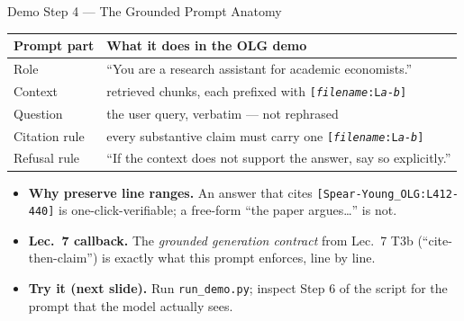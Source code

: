 \begin{frame}{Demo Step 4 --- The Grounded Prompt Anatomy}
\small
\begin{tabular}{p{2.6cm}p{8.9cm}}
\toprule
\textbf{Prompt part} & \textbf{What it does in the OLG demo} \\
\midrule
Role & ``You are a research assistant for academic economists.'' \\
Context & retrieved chunks, each prefixed with \texttt{[\textit{filename}:L\textit{a}-\textit{b}]} \\
Question & the user query, verbatim --- not rephrased \\
Citation rule & every substantive claim must carry one \texttt{[\textit{filename}:L\textit{a}-\textit{b}]} \\
Refusal rule & ``If the context does not support the answer, say so explicitly.'' \\
\bottomrule
\end{tabular}

\vspace{0.3cm}
\begin{itemize}\small
\item \textbf{Why preserve line ranges.} An answer that cites \texttt{[Spear-Young\_OLG:L412-440]} is one-click-verifiable; a free-form ``the paper argues\dots'' is not.

\item \textbf{Lec.\ 7 callback.} The \emph{grounded generation contract} from Lec.\ 7 T3b (``cite-then-claim'') is exactly what this prompt enforces, line by line.

\item \textbf{Try it (next slide).} Run \texttt{run\_demo.py}; inspect Step 6 of the script for the prompt that the model actually sees.
\end{itemize}
\end{frame}

